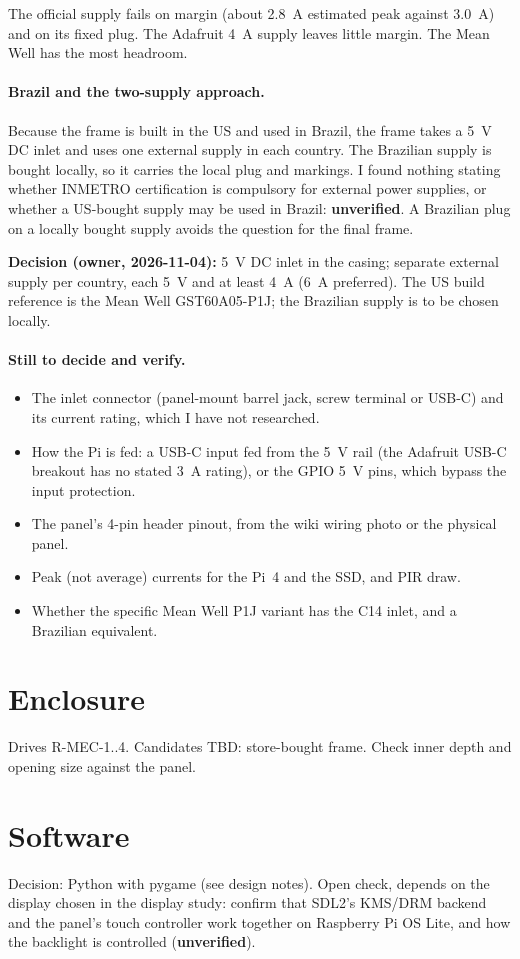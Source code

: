 \documentclass[11pt,a4paper]{article}
\begin{document}
The official supply fails on margin (about 2.8~A estimated peak against 3.0~A) and on its fixed plug. The Adafruit 4~A supply leaves little margin. The Mean Well has the most headroom.

\paragraph{Brazil and the two-supply approach.}
Because the frame is built in the US and used in Brazil, the frame takes a 5~V DC inlet and uses one external supply in each country. The Brazilian supply is bought locally, so it carries the local plug and markings. I found nothing stating whether INMETRO certification is compulsory for external power supplies, or whether a US-bought supply may be used in Brazil: \textbf{unverified}. A Brazilian plug on a locally bought supply avoids the question for the final frame.

\textbf{Decision (owner, 2026-11-04):} 5~V DC inlet in the casing; separate external supply per country, each 5~V and at least 4~A (6~A preferred). The US build reference is the Mean Well GST60A05-P1J; the Brazilian supply is to be chosen locally.

\paragraph{Still to decide and verify.}
\begin{itemize}
  \item The inlet connector (panel-mount barrel jack, screw terminal or USB-C) and its current rating, which I have not researched.
  \item How the Pi is fed: a USB-C input fed from the 5~V rail (the Adafruit USB-C breakout has no stated 3~A rating), or the GPIO 5~V pins, which bypass the input protection.
  \item The panel's 4-pin header pinout, from the wiki wiring photo or the physical panel.
  \item Peak (not average) currents for the Pi~4 and the SSD, and PIR draw.
  \item Whether the specific Mean Well P1J variant has the C14 inlet, and a Brazilian equivalent.
\end{itemize}

\section{Enclosure}
Drives R-MEC-1..4. Candidates TBD: store-bought frame. Check inner depth and opening size against the panel.

\section{Software}
Decision: Python with pygame (see design notes). Open check, depends on the display chosen in the display study: confirm that SDL2's KMS/DRM backend and the panel's touch controller work together on Raspberry Pi OS Lite, and how the backlight is controlled (\textbf{unverified}).
\end{document}
